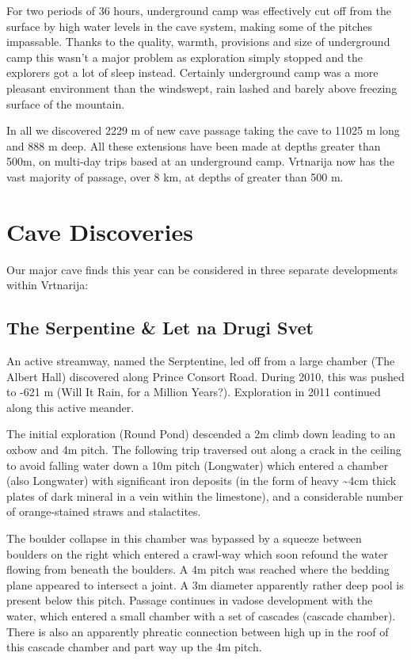 For two periods of 36 hours, underground camp was effectively cut off
from the surface by high water levels in the cave system, making some of
the pitches impassable. Thanks to the quality, warmth, provisions and
size of underground camp this wasn't a major problem as exploration
simply stopped and the explorers got a lot of sleep instead. Certainly
underground camp was a more pleasant environment than the windswept,
rain lashed and barely above freezing surface of the mountain.

In all we discovered 2229 m of new cave passage taking the cave to 11025
m long and 888 m deep. All these extensions have been made at depths
greater than 500m, on multi-day trips based at an underground camp.
Vrtnarija now has the vast majority of passage, over 8 km, at depths of
greater than 500 m.

\section{Cave Discoveries}

Our major cave finds this year can be considered in three separate
developments within Vrtnarija:

\subsection{The Serpentine \& Let na Drugi Svet}

An active streamway, named the Serptentine, led off from a large chamber
(The Albert Hall) discovered along Prince Consort Road. During 2010,
this was pushed to -621 m (Will It Rain, for a Million Years?).
Exploration in 2011 continued along this active meander.

The initial exploration (Round Pond) descended a 2m climb down leading
to an oxbow and 4m pitch. The following trip traversed out along a crack
in the ceiling to avoid falling water down a 10m pitch (Longwater) which
entered a chamber (also Longwater) with significant iron deposits (in
the form of heavy \textasciitilde{}4cm thick plates of dark mineral in a
vein within the limestone), and a considerable number of orange-stained
straws and stalactites.

The boulder collapse in this chamber was bypassed by a squeeze between
boulders on the right which entered a crawl-way which soon refound the
water flowing from beneath the boulders. A 4m pitch was reached where
the bedding plane appeared to intersect a joint. A 3m diameter
apparently rather deep pool is present below this pitch. Passage
continues in vadose development with the water, which entered a small
chamber with a set of cascades (cascade chamber). There is also an
apparently phreatic connection between high up in the roof of this
cascade chamber and part way up the 4m pitch.

